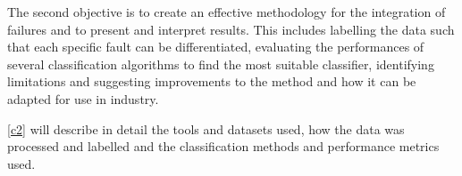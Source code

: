 The second objective is to create an effective methodology for the integration
of failures and to present and interpret results. This includes labelling the
data such that each specific fault can be differentiated, evaluating the
performances of several classification algorithms to find the most suitable
classifier, identifying limitations and suggesting improvements to the method
and how it can be adapted for use in industry.

\autoref{c2} will describe in detail the tools and datasets used, how the data
was processed and labelled and the classification methods and performance
metrics used.

